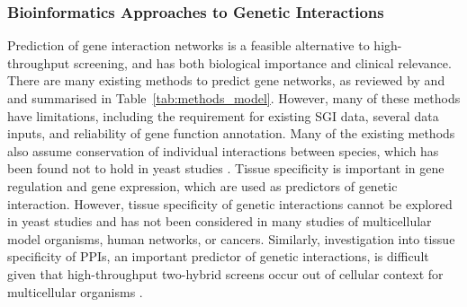 \subsubsection{Bioinformatics Approaches to Genetic Interactions}

Prediction of gene interaction networks is a feasible alternative to high-throughput screening, and has both biological importance and clinical relevance. There are many existing methods to predict gene networks, as reviewed by \citet{vanSteen2011} and \citet{Boucher2013} and summarised in Table~\ref{tab:methods_model}. However, many of these methods have limitations, including the requirement for existing \gls{SGI} data, several data inputs, and reliability of gene function annotation. Many of the existing methods also assume conservation of individual interactions between species, which has been found not to hold in yeast studies \citep{Dixon2008}. Tissue specificity is important in gene regulation and \gls{gene expression}, which are used as predictors of genetic interaction. However, tissue specificity of genetic interactions cannot be explored in yeast studies and has not been considered in many studies of multicellular model organisms, human networks, or cancers. Similarly, investigation into tissue specificity of \glspl{PPI}, an important predictor of genetic interactions, is difficult given that high-throughput two-hybrid screens occur out of cellular context for multicellular organisms \citep{Bruckner2009}.  

